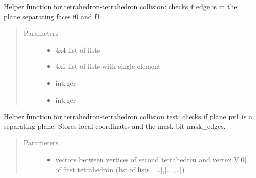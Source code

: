 \documentclass[letterpaper,10pt,english]{sphinxmanual}
\begin{document}
\begin{fulllineitems}

\begin{fulllineitems}
\label{\detokenize{pk_src.collision_tet_tet:pk_src.collision_tet_tet.Collision_tet_tet.separating_plane_edge_A}}
Helper function for tetrahedron-tetrahedron collision: checks if edge is in the plane separating faces f0 and f1.
\begin{quote}\begin{description}
\item[{Parameters}] \leavevmode\begin{itemize}
\item {} 
 \textendash{} 4x4 list of lists

\item {} 
 \textendash{} 4x1 list of lists with single element

\item {} 
 \textendash{} integer

\item {} 
 \textendash{} integer

\end{itemize}

\end{description}\end{quote}

\end{fulllineitems}


\begin{fulllineitems}
\label{\detokenize{pk_src.collision_tet_tet:pk_src.collision_tet_tet.Collision_tet_tet.separating_plane_faceA_1}}
Helper function for tetrahedron-tetrahedron collision test:
checks if plane pv1 is a separating plane. Stores local coordinates and the mask bit mask\_edges.
\begin{quote}\begin{description}
\item[{Parameters}] \leavevmode\begin{itemize}
\item {} 
 \textendash{} vectors between vertices of second tetrahedron and vertex V{[}0{]} of first tetrahedron (list of lists {[}{[}…{]},{[}…{]},…{]})


\end{itemize}
\end{description}
\end{quote}
\end{fulllineitems}
\end{fulllineitems}
\end{document}
